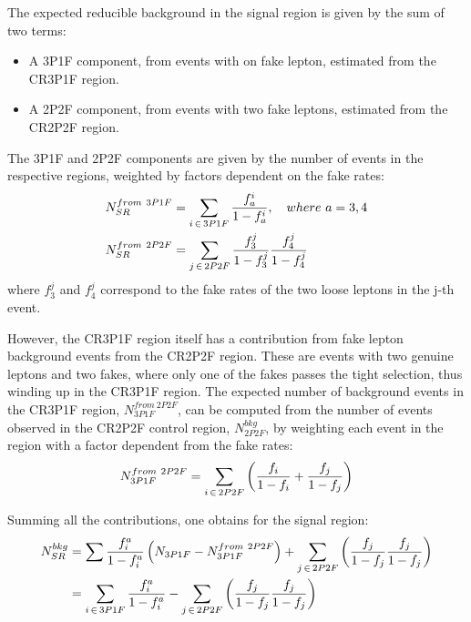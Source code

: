 The expected reducible background in the signal region is given by the sum of two terms:
\begin{itemize}
  \item A 3P1F component, from events with on fake lepton, estimated from the CR3P1F region.
  \item A 2P2F component, from events with two fake leptons, estimated from the CR2P2F region.
\end{itemize}

The 3P1F and 2P2F components are given by the number of events in the respective regions, weighted by factors dependent on the fake rates:
\begin{subequations}
  \begin{align}
    \label{eq:lepFR_3P1Fto4P}
    N^{from\ 3P1F}_{SR} &= \sum_{i \,\in\, 3P1F} \frac{f_a^i}{1-f_a^i}, \quad where\ a = 3, 4
    \\
    \label{eq:lepFR_2P2Fto4P}
    N^{from\ 2P2F}_{SR} &= \sum_{j \,\in\, 2P2F} \frac{f_3^j}{1-f_3^j} \frac{f_4^j}{1-f_4^j}
  \end{align}
\end{subequations}
where $f_3^j$ and $f_4^j$ correspond to the fake rates of the two loose leptons in the j-th event.

However, the CR3P1F region itself has a contribution from fake lepton background events from the CR2P2F region.
These are events with two genuine leptons and two fakes, where only one of the fakes passes the tight selection, thus winding up in the CR3P1F region.
The expected number of background events in the CR3P1F region, $N^{from\ 2P2F}_{3P1F}$,
can be computed from the number of events observed in the CR2P2F control region, $N^{bkg}_{2P2F}$,
by weighting each event in the region with a factor dependent from the fake rates:
\begin{equation}
  \label{eq:lepFR_N3P1F}
  N^{from\ 2P2F}_{3P1F} = \sum_{i \,\in\, 2P2F} \left( \frac{f_i}{1-f_i} + \frac{f_j}{1-f_j} \right)
\end{equation}

Summing all the contributions, one obtains for the signal region:
\begin{equation}
  \begin{split}
    \label{eq:lepFR_4P}
    N^{bkg}_{SR} &= \sum \frac{f^a_i}{1-f^a_i} \left( N_{3P1F} - N^{from\ 2P2F}_{3P1F} \right) + \sum_{j \,\in\, 2P2F} \left( \frac{f_j}{1-f_j} \frac{f_j}{1-f_j} \right)
    \\
                 &= \sum_{i \,\in\, 3P1F} \frac{f^a_i}{1-f^a_i} - \sum_{j \,\in\, 2P2F} \left( \frac{f_j}{1-f_j} \frac{f_j}{1-f_j} \right)
  \end{split}
\end{equation}


